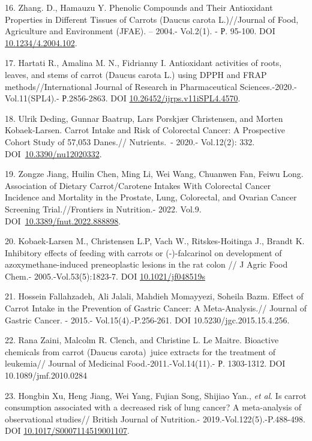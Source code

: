 16. Zhang. D., Hamauzu Y. Phenolic Compounds and Their Antioxidant
Properties in Different Tissues of Carrots (Daucus carota L.)//Journal
of Food, Agriculture and Environment (JFAE). -- 2004.- Vol.2(1). - Р.
95-100. DOI~ \href{javascript:void()}{10.1234/4.2004.102}.

17. Hartati R., Amalina M. N., Fidrianny I. Antioxidant activities of
roots, leaves, and stems of carrot (Daucus carota L.) using DPPH and
FRAP methods//International Journal of Research in Pharmaceutical
Sciences.-2020.-Vol.11(SPL4).- Р.2856-2863. DOI
\href{http://dx.doi.org/10.26452/ijrps.v11iSPL4.4570}{10.26452/ijrps.v11iSPL4.4570}.

18. Ulrik Deding, Gunnar Baatrup, Lars Porskjær Christensen, and Morten
Kobaek-Larsen. Carrot Intake and Risk of Colorectal Cancer: A
Prospective Cohort Study of 57,053 Danes.// Nutrients.~- 2020.-
Vol.12(2): 332.
DOI~\href{https://doi.org/10.3390/nu12020332}{10.3390/nu12020332}.

19. Zongze Jiang, Huilin Chen, Ming Li, Wei Wang, Chuanwen Fan, Feiwu
Long. Association of Dietary Carrot/Carotene Intakes With Colorectal
Cancer Incidence and Mortality in the Prostate, Lung, Colorectal, and
Ovarian Cancer Screening Trial.//Frontiers in Nutrition.- 2022. Vol.9.
DOI~\href{https://doi.org/10.3389/fnut.2022.888898}{10.3389/fnut.2022.888898}.

20. Kobaek-Larsen M., Christensen L.P, Vach W., Ritskes-Hoitinga J.,
Brandt K. Inhibitory effects of feeding with carrots or (-)-falcarinol
on development of azoxymethane-induced preneoplastic lesions in the rat
colon // J Agric Food Chem.- 2005.-Vol.53(5):1823-7. DOI
\href{https://doi.org/10.1021/jf048519s}{10.1021/jf048519s}

21. Hossein Fallahzadeh, Ali Jalali, Mahdieh Momayyezi, Soheila Bazm.
Effect of Carrot Intake in the Prevention of Gastric Cancer: A
Meta-Analysis.// Journal of Gastric Cancer. - 2015.-
Vol.15(4).-P.256-261. DOI 10.5230/jgc.2015.15.4.256.

22. Rana Zaini, Malcolm R. Clench, and Christine L. Le Maitre. Bioactive
chemicals from carrot (Daucus carota)~juice extracts for the treatment
of leukemia// Journal of Medicinal Food.-2011.-Vol.14(11).- Р.
1303-1312. DOI 10.1089/jmf.2010.0284

23. Hongbin Xu, Heng Jiang, Wei Yang, Fujian Song, Shijiao Yan.,
\emph{et al}. Is carrot consumption associated with a decreased risk of
lung cancer? A meta-analysis of observational studies// British Journal
of Nutrition.- 2019.-Vol.122(5).-P.488-498. DOI
\href{https://doi.org/10.1017/s0007114519001107}{10.1017/S0007114519001107}.

